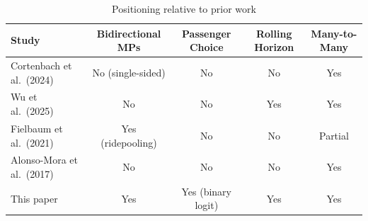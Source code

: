 \begin{table}[h]
\centering
\caption{Positioning relative to prior work}
\label{tab:literature-gap}
\begin{tabular}{lcccc}
\toprule
Study & Bidirectional MPs & Passenger Choice & Rolling Horizon & Many-to-Many \\
\midrule
Cortenbach et al.\ (2024) & No (single-sided) & No & No & Yes \\
Wu et al.\ (2025)         & No                & No & Yes & Yes \\
Fielbaum et al.\ (2021)   & Yes (ridepooling) & No & No & Partial \\
Alonso-Mora et al.\ (2017)& No                & No & No & Yes \\
This paper                & Yes               & Yes (binary logit) & Yes & Yes \\
\bottomrule
\end{tabular}
\end{table}
